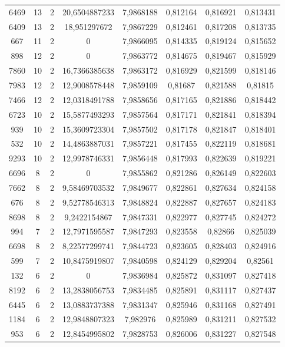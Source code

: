 \begin{longtable}{|c|c|c|c|c|c|c|c|}
6469 & 13 & 2 & 20,6504887233 & 7,9868188 & 0,812164 & 0,816921 & 0,813431 \\
6409 & 13 & 2 & 18,951297672 & 7,9867229 & 0,812461 & 0,817208 & 0,813735 \\
667 & 11 & 2 & 0 & 7,9866095 & 0,814335 & 0,819124 & 0,815652 \\
898 & 12 & 2 & 0 & 7,9863772 & 0,814675 & 0,819467 & 0,815929 \\
7860 & 10 & 2 & 16,7366385638 & 7,9863172 & 0,816929 & 0,821599 & 0,818146 \\
7983 & 12 & 2 & 12,9008578448 & 7,9859109 & 0,81687 & 0,821588 & 0,81815 \\
7466 & 12 & 2 & 12,0318491788 & 7,9858656 & 0,817165 & 0,821886 & 0,818442 \\
6723 & 10 & 2 & 15,5877493293 & 7,9857564 & 0,817171 & 0,821841 & 0,818394 \\
939 & 10 & 2 & 15,3609723304 & 7,9857502 & 0,817178 & 0,821847 & 0,818401 \\
532 & 10 & 2 & 14,4863887031 & 7,9857221 & 0,817455 & 0,822119 & 0,818681 \\
9293 & 10 & 2 & 12,9978746331 & 7,9856448 & 0,817993 & 0,822639 & 0,819221 \\
6696 & 8 & 2 & 0 & 7,9855862 & 0,821286 & 0,826149 & 0,822603 \\
7662 & 8 & 2 & 9,58469703532 & 7,9849677 & 0,822861 & 0,827634 & 0,824158 \\
676 & 8 & 2 & 9,52778546313 & 7,9848824 & 0,822887 & 0,827657 & 0,824183 \\
8698 & 8 & 2 & 9,2422154867 & 7,9847331 & 0,822977 & 0,827745 & 0,824272 \\
994 & 7 & 2 & 12,7971595587 & 7,9847293 & 0,823558 & 0,82866 & 0,825039 \\
6698 & 8 & 2 & 8,22577299741 & 7,9844723 & 0,823605 & 0,828403 & 0,824916 \\
599 & 7 & 2 & 10,8475919807 & 7,9840598 & 0,824129 & 0,829204 & 0,82561 \\
132 & 6 & 2 & 0 & 7,9836984 & 0,825872 & 0,831097 & 0,827418 \\
8192 & 6 & 2 & 13,2838056753 & 7,9834485 & 0,825891 & 0,831117 & 0,827437 \\
6445 & 6 & 2 & 13,0883737388 & 7,9831347 & 0,825946 & 0,831168 & 0,827491 \\
1184 & 6 & 2 & 12,9848807323 & 7,982976 & 0,825989 & 0,831211 & 0,827532 \\
953 & 6 & 2 & 12,8454995802 & 7,9828753 & 0,826006 & 0,831227 & 0,827548 \\

\end{longtable}
